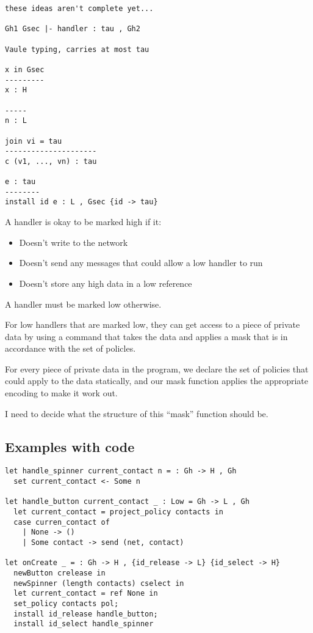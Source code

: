 \documentclass[conference]{IEEEtran}
\newcommand{\code}[1]{\text{\lstinline!#1!}}
\theoremstyle{definition}
\begin{document}
\begin{verbatim}
these ideas aren't complete yet...

Gh1 Gsec |- handler : tau , Gh2

Vaule typing, carries at most tau

x in Gsec
---------
x : H

-----
n : L

join vi = tau
---------------------
c (v1, ..., vn) : tau

e : tau
--------
install id e : L , Gsec {id -> tau}
\end{verbatim}


A handler is okay to be marked high if it:
\begin{itemize}
\item Doesn't write to the network
\item Doesn't send any messages that could allow a low handler to run
\item Doesn't store any high data in a low reference
\end{itemize}

A handler must be marked low otherwise.

For low handlers that are marked low, they can get access to a piece
of private data by using a command \code{mask} that takes the data and
applies a mask that is in accordance with the set of policles.

For every piece of private data in the program, we declare the set of
policies that could apply to the data statically, and our mask
function applies the appropriate encoding to make it work out.

I need to decide what the structure of this ``mask'' function should
be.

\subsection{Examples with code}


\begin{lstlisting}
let handle_spinner current_contact n = : Gh -> H , Gh
  set current_contact <- Some n

let handle_button current_contact _ : Low = Gh -> L , Gh
  let current_contact = project_policy contacts in
  case curren_contact of
    | None -> ()
    | Some contact -> send (net, contact)

let onCreate _ = : Gh -> H , {id_release -> L} {id_select -> H}
  newButton crelease in
  newSpinner (length contacts) cselect in
  let current_contact = ref None in
  set_policy contacts pol;
  install id_release handle_button;
  install id_select handle_spinner
\end{lstlisting}
\end{document}
